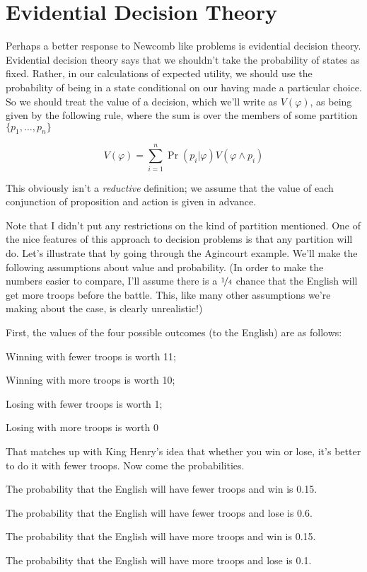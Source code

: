 \section{Evidential Decision Theory}
Perhaps a better response to Newcomb like problems is evidential decision theory. Evidential decision theory says that we shouldn't take the probability of states as fixed. Rather, in our calculations of expected utility, we should use the probability of being in a state conditional on our having made a particular choice. So we should treat the value of a decision, which we'll write as $V(\varphi)$, as being given by the following rule, where the sum is over the members of some partition $\{p_1, \dots, p_n\}$

\begin{equation*}
V(\varphi) = \sum_{i=1}^n \Pr(p_i | \varphi) V(\varphi \wedge p_i)
\end{equation*}

\noindent This obviously isn't a \textit{reductive} definition; we assume that the value of each conjunction of proposition and action is given in advance.

Note that I didn't put any restrictions on the kind of partition mentioned. One of the nice features of this approach to decision problems is that any partition will do. Let's illustrate that by going through the Agincourt example. We'll make the following assumptions about value and probability. (In order to make the numbers easier to compare, I'll assume there is a $\nicefrac{1}{4}$ chance that the English will get more troops before the battle. This, like many other assumptions we're making about the case, is clearly unrealistic!)

First, the values of the four possible outcomes (to the English) are as follows:

\begin{itemize*}
\item Winning with fewer troops is worth 11;
\item Winning with more troops is worth 10;
\item Losing with fewer troops is worth 1;
\item Losing with more troops is worth 0
\end{itemize*}

\noindent That matches up with King Henry's idea that whether you win or lose, it's better to do it with fewer troops. Now come the probabilities.

\begin{itemize*}
\item The probability that the English will have fewer troops and win is 0.15.
\item The probability that the English will have fewer troops and lose is 0.6.
\item The probability that the English will have more troops and win is 0.15.
\item The probability that the English will have more troops and lose is 0.1.
\end{itemize*}

